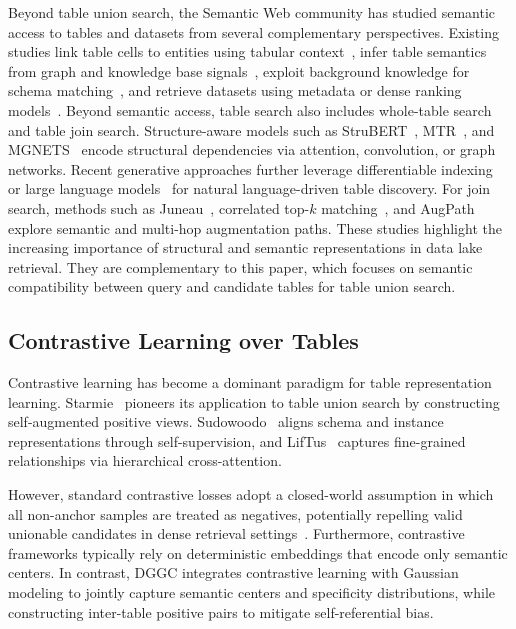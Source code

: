 Beyond table union search, the Semantic Web community has studied semantic access to tables and datasets from several complementary perspectives. Existing studies link table cells to entities using tabular context~\cite{bhagavatula2015tabel,efthymiou2017matching,cutrona2020tough}, infer table semantics from graph and knowledge base signals~\cite{vu2021graph,qiu2023dependency}, exploit background knowledge for schema matching~\cite{portisch2021background}, and retrieve datasets using metadata or dense ranking models~\cite{benjelloun2020google,chen2023dense}. Beyond semantic access, table search also includes whole-table search and table join search. Structure-aware models such as StruBERT~\cite{trabelsi2022strubert}, MTR~\cite{shraga2020web}, and MGNETS~\cite{chen2021mgnets} encode structural dependencies via attention, convolution, or graph networks. Recent generative approaches further leverage differentiable indexing~\cite{guo2025birdie} or large language models~\cite{cui2024tablecopilot} for natural language-driven table discovery. For join search, methods such as Juneau~\cite{zhang2019finding}, correlated top-$k$ matching~\cite{pradhan2023searching}, and AugPath~\cite{gong2025let} explore semantic and multi-hop augmentation paths. These studies highlight the increasing importance of structural and semantic representations in data lake retrieval. They are complementary to this paper, which focuses on semantic compatibility between query and candidate tables for table union search.

\subsection{Contrastive Learning over Tables}
Contrastive learning has become a dominant paradigm for table representation learning. Starmie~\cite{fan2023starmie} pioneers its application to table union search by constructing self-augmented positive views. Sudowoodo~\cite{zhang2023sudowoodo} aligns schema and instance representations through self-supervision, and LifTus~\cite{qiu2025liftus} captures fine-grained relationships via hierarchical cross-attention.

However, standard contrastive losses adopt a closed-world assumption in which all non-anchor samples are treated as negatives, potentially repelling valid unionable candidates in dense retrieval settings~\cite{qu2021rocketqa}. Furthermore, contrastive frameworks typically rely on deterministic embeddings that encode only semantic centers. In contrast, DGGC integrates contrastive learning with Gaussian modeling to jointly capture semantic centers and specificity distributions, while constructing inter-table positive pairs to mitigate self-referential bias.